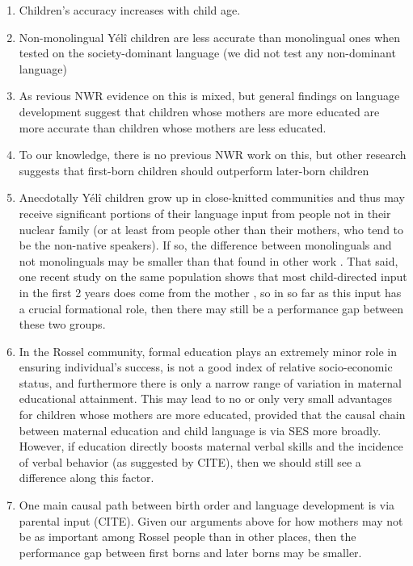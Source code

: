 \documentclass[english,,man,floatsintext]{apa6}
\begin{document}
\begin{enumerate}
\def\labelenumi{\arabic{enumi}.}
\setcounter{enumi}{2}
\item
  Children's accuracy increases with child age.
\item
  Non-monolingual Yélî children are less accurate than monolingual ones when tested on the society-dominant language (we did not test any non-dominant language)
\item
  As revious NWR evidence on this is mixed, but general findings on language development suggest that children whose mothers are more educated are more accurate than children whose mothers are less educated.
\item
  To our knowledge, there is no previous NWR work on this, but other research suggests that first-born children should outperform later-born children
\item
  Anecdotally Yélî children grow up in close-knitted communities and thus may receive significant portions of their language input from people not in their nuclear family
  (or at least from people other than their mothers, who tend to be the non-native speakers). If so, the difference between monolinguals and not monolinguals may be smaller than that found in other work
  . That said, one recent study on the same population shows that most child-directed input in the first 2 years does come from the mother
  , so in so far as this input has a crucial formational role, then there may still be a performance gap between these two groups.
\item
  In the Rossel community, formal education plays an extremely minor role in ensuring individual's success, is not a good index of relative socio-economic status, and furthermore there is only a narrow range of variation in maternal educational attainment. This may lead to no or only very small advantages for children whose mothers are more educated, provided that the causal chain between maternal education and child language is via SES more broadly. However, if education directly boosts maternal verbal skills and the incidence of verbal behavior (as suggested by CITE), then we should still see a difference along this factor.
\item
  One main causal path between birth order and language development is via parental input (CITE). Given our arguments above for how mothers may not be as important among Rossel people than in other places, then the performance gap between first borns and later borns may be smaller.
\end{enumerate}
\end{document}
